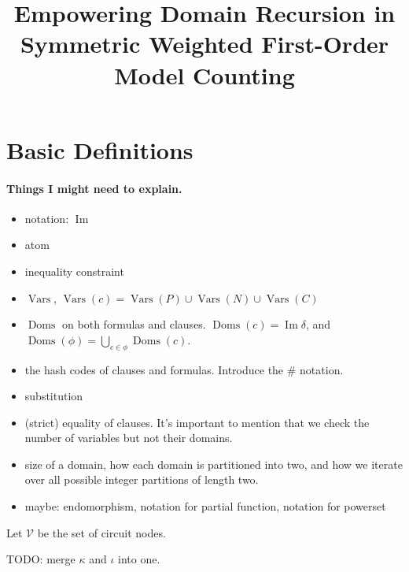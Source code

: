 \documentclass{article}
\title{Empowering Domain Recursion in Symmetric Weighted First-Order Model Counting}
\theoremstyle{definition}
\DeclareMathOperator{\Imm}{Im}
\DeclareMathOperator{\Doms}{Doms}
\DeclareMathOperator{\Vars}{Vars}
\begin{document}
\maketitle

\section{Basic Definitions}

\paragraph{Things I might need to explain.}
\begin{itemize}
\item notation: $\Imm$
\item atom
\item inequality constraint
\item $\Vars$, $\Vars(c) = \Vars(P) \cup \Vars(N) \cup \Vars(C)$
\item $\Doms$ on both formulas and clauses. $\Doms(c) = \Imm \delta$, and $\Doms(\phi) = \bigcup_{c \in \phi} \Doms(c)$.
\item the hash codes of clauses and formulas. Introduce the $\#$ notation.
\item substitution
\item (strict) equality of clauses. It's important to mention that we check the number of variables but not their domains.
\item size of a domain, how each domain is partitioned into two, and how we iterate over all possible integer partitions of length two.
\item maybe: endomorphism, notation for partial function, notation for powerset
\end{itemize}

Let $\mathscr{V}$ be the set of circuit nodes.

TODO: merge $\kappa$ and $\iota$ into one.
\end{document}
